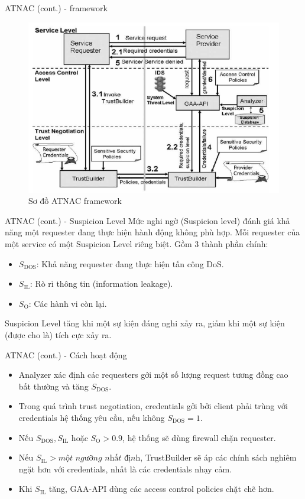 \documentclass[11pt]{beamer}
\begin{document}
\begin{frame}{ATNAC (cont.) - framework}
\begin{figure}
\centering
\includegraphics[scale=.5]{img/atnac.png}
\caption{Sơ đồ ATNAC framework}
\label{fig:atnac}
\end{figure}
\end{frame}

\begin{frame}{ATNAC (cont.) - Suspicion Level}
Mức nghi ngờ (Suspicion level) đánh giá khả năng một requester đang thực hiện hành động không phù hợp. Mỗi requester của một service có một Suspicion Level riêng biệt. Gồm 3 thành phần chính:
\begin{itemize}
\item $S_\text{DOS}$: Khả năng requester đang thực hiện tấn công DoS.
\item $S_\text{IL}$: Rò rỉ thông tin (information leakage).
\item $S_\text{O}$: Các hành vi còn lại.
\end{itemize}
Suspicion Level tăng khi một sự kiện đáng nghi xảy ra, giảm khi một sự kiện (được cho là) tích cực xảy ra.
\end{frame}

\begin{frame}{ATNAC (cont.) - Cách hoạt động}
\begin{itemize}
\item Analyzer xác định các requesters gởi một số lượng request tương đồng cao bất thường và tăng $S_\text{DOS}$.
\item Trong quá trình trust negotiation, credentials gởi bởi client phải trùng với credentials hệ thống yêu cầu, nếu không $S_\text{DOS} = 1$.
\item Nếu $S_\text{DOS}, S_\text{IL}$ hoặc $S_\text{O} > 0.9$, hệ thống sẽ dùng firewall chặn requester.
\item Nếu $S_\text{IL} > \textit{một ngưỡng nhất định}$, TrustBuilder sẽ áp các chính sách nghiêm ngặt hơn với credentials, nhất là các credentials nhạy cảm.
\item Khi $S_\text{IL}$ tăng, GAA-API dùng các access control policies chặt chẽ hơn.
\end{itemize}
\end{frame}
\end{document}
